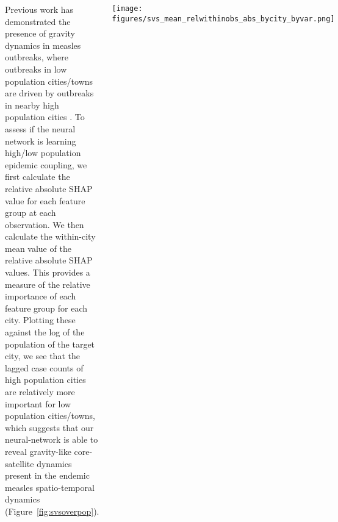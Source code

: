 \documentclass[20pt,margin=1in,innermargin=0in,blockverticalspace=-0.3in]{tikzposter}
\begin{document}
\begin{columns}
{        Previous work has demonstrated the presence of gravity dynamics in measles outbreaks, where outbreaks in low population cities/towns are driven by outbreaks in nearby high population cities \cite{xia2004measles}.
        To assess if the neural network is learning high/low population epidemic coupling, we first calculate the relative absolute SHAP value for each feature group at each observation. 
        We then calculate the within-city mean value of the relative absolute SHAP values.
        This provides a measure of the relative importance of each feature group for each city.
        Plotting these against the log of the population of the target city, we see that the lagged case counts of high population cities are relatively more important for low population cities/towns, which suggests that our neural-network is able to reveal gravity-like core-satellite dynamics \cite{lau2020competing} present in the endemic measles spatio-temporal dynamics (Figure~\ref{fig:svsoverpop}).
        \begin{tikzfigure}
            \texttt{[image: figures/svs\_mean\_relwithinobs\_abs\_bycity\_byvar.png]}
            \vspace{-0.5em}
             \label{fig:svsoverpop}
        \end{tikzfigure}
        \vspace{2em}


     }

    
\end{columns}
\end{document}
